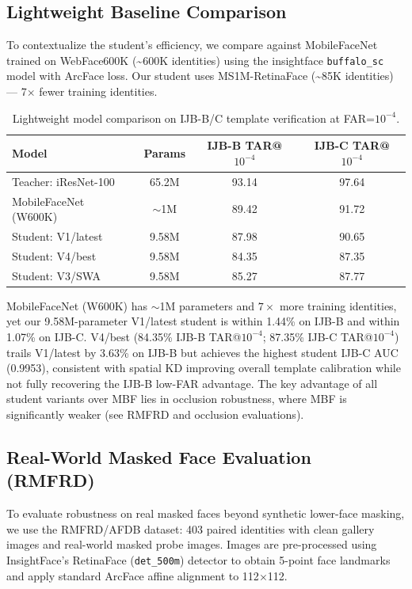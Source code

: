 \subsection{Lightweight Baseline Comparison}

To contextualize the student's efficiency, we compare against MobileFaceNet trained on WebFace600K (\textasciitilde600K identities) using the insightface \texttt{buffalo\_sc} model with ArcFace loss. Our student uses MS1M-RetinaFace (\textasciitilde85K identities) — 7$\times$ fewer training identities.

\begin{table}[h]
\centering
\caption{Lightweight model comparison on IJB-B/C template verification at FAR=$10^{-4}$.}
\label{tab:baseline_comparison}
\begin{tabular}{lccc}
\hline
\textbf{Model} & \textbf{Params} & \textbf{IJB-B TAR@$10^{-4}$} & \textbf{IJB-C TAR@$10^{-4}$} \\
\hline
Teacher: iResNet-100 & 65.2M & 93.14 & 97.64 \\
MobileFaceNet (W600K) & $\sim$1M & 89.42 & 91.72 \\
Student: V1/latest & 9.58M & 87.98 & 90.65 \\
Student: V4/best & 9.58M & 84.35 & 87.35 \\
Student: V3/SWA & 9.58M & 85.27 & 87.77 \\
\hline
\end{tabular}
\end{table}

MobileFaceNet (W600K) has $\sim$1M parameters and $7\times$ more training identities, yet our 9.58M-parameter V1/latest student is within 1.44\% on IJB-B and within 1.07\% on IJB-C. V4/best (84.35\% IJB-B TAR@$10^{-4}$; 87.35\% IJB-C TAR@$10^{-4}$) trails V1/latest by 3.63\% on IJB-B but achieves the highest student IJB-C AUC (0.9953), consistent with spatial KD improving overall template calibration while not fully recovering the IJB-B low-FAR advantage. The key advantage of all student variants over MBF lies in occlusion robustness, where MBF is significantly weaker (see RMFRD and occlusion evaluations).

\subsection{Real-World Masked Face Evaluation (RMFRD)}

To evaluate robustness on real masked faces beyond synthetic lower-face masking, we use the RMFRD/AFDB dataset: 403 paired identities with clean gallery images and real-world masked probe images. Images are pre-processed using InsightFace's RetinaFace (\texttt{det\_500m}) detector to obtain 5-point face landmarks and apply standard ArcFace affine alignment to 112$\times$112.

